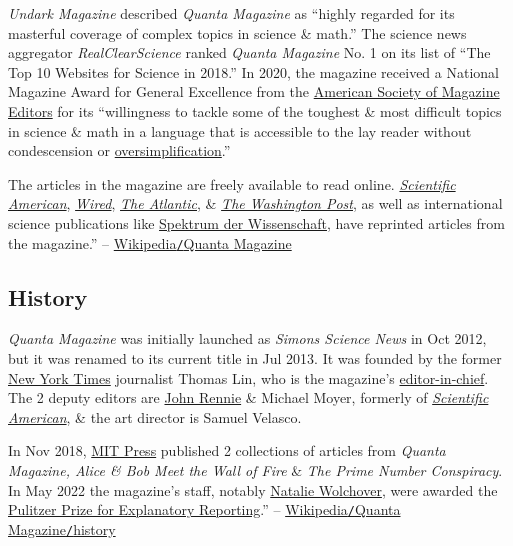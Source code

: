 \documentclass[oneside]{book}
\numberwithin{equation}{section}
\begin{document}
\textit{Undark Magazine} described \textit{Quanta Magazine} as ``highly regarded for its masterful coverage of complex topics in science \& math.'' The science news aggregator \textit{RealClearScience} ranked \textit{Quanta Magazine} No. 1 on its list of ``The Top 10 Websites for Science in 2018.'' In 2020, the magazine received a National Magazine Award for General Excellence from the \href{https://en.wikipedia.org/wiki/American_Society_of_Magazine_Editors}{American Society of Magazine Editors} for its ``willingness to tackle some of the toughest \& most difficult topics in science \& math in a language that is accessible to the lay reader without condescension or \href{https://en.wikipedia.org/wiki/Oversimplification}{oversimplification}.''

The articles in the magazine are freely available to read online. \href{https://en.wikipedia.org/wiki/Scientific_American}{\textit{Scientific American}}, \href{https://en.wikipedia.org/wiki/Wired_(magazine)}{\textit{Wired}}, \href{https://en.wikipedia.org/wiki/The_Atlantic}{\textit{The Atlantic}}, \& \href{https://en.wikipedia.org/wiki/The_Washington_Post}{\textit{The Washington Post}}, as well as international science publications like \href{https://en.wikipedia.org/wiki/Spektrum_der_Wissenschaft}{Spektrum der Wissenschaft}, have reprinted articles from the magazine.'' -- \href{https://en.wikipedia.org/wiki/Quanta_Magazine}{Wikipedia\texttt{/}Quanta Magazine}

\subsection{History}
\textit{Quanta Magazine} was initially launched as \textit{Simons Science News} in Oct 2012, but it was renamed to its current title in Jul 2013. It was founded by the former \href{https://en.wikipedia.org/wiki/New_York_Times}{New York Times} journalist Thomas Lin, who is the magazine's \href{https://en.wikipedia.org/wiki/Editor-in-chief}{editor-in-chief}. The 2 deputy editors are \href{https://en.wikipedia.org/wiki/John_Rennie_(editor)}{John Rennie} \& Michael Moyer, formerly of \href{https://en.wikipedia.org/wiki/Scientific_American}{\textit{Scientific American}}, \& the art director is Samuel Velasco.

In Nov 2018, \href{https://en.wikipedia.org/wiki/MIT_Press}{MIT Press} published 2 collections of articles from \textit{Quanta Magazine, Alice \& Bob Meet the Wall of Fire} \& \textit{The Prime Number Conspiracy}. In May 2022 the magazine's staff, notably \href{https://en.wikipedia.org/wiki/Natalie_Wolchover}{Natalie Wolchover}, were awarded the \href{https://en.wikipedia.org/wiki/Pulitzer_Prize_for_Explanatory_Reporting}{Pulitzer Prize for Explanatory Reporting}.'' -- \href{https://en.wikipedia.org/wiki/Quanta_Magazine}{Wikipedia\texttt{/}Quanta Magazine\texttt{/}history}
\end{document}
